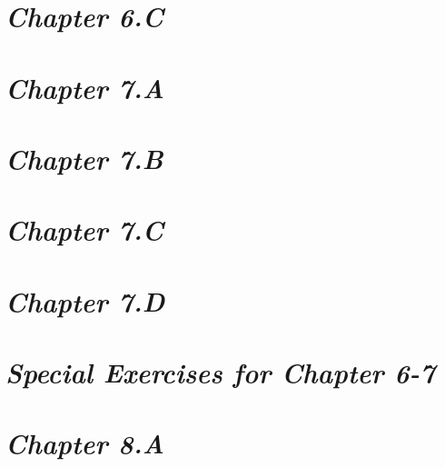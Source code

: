 \documentclass[a4paper,12pt]{article}
\begin{document}
    \newpage

    \section{\large \textit{Chapter 6.C}}

    

    \newpage

    \section{\large \textit{Chapter 7.A}}

    

    \newpage

    \section{\large \textit{Chapter 7.B}}

    

    \newpage

    \section{\large \textit{Chapter 7.C}}

    

    \newpage

    \section{\large \textit{Chapter 7.D}}

    

    \newpage

    \section{\large \textit{Special Exercises for Chapter 6-7}}

    

    \newpage

    \section{\large \textit{Chapter 8.A}}

    
\end{document}
